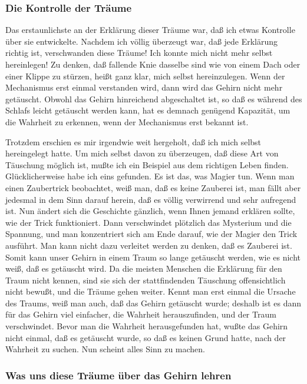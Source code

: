 \subsubsection{Die Kontrolle der Träume}
\label{c3_5f}

Das erstaunlichste an der Erklärung dieser Träume war, daß ich etwas Kontrolle über sie entwickelte.
Nachdem ich völlig überzeugt war, daß jede Erklärung richtig ist, verschwanden diese Träume!
Ich konnte mich nicht mehr selbst hereinlegen!
Zu denken, daß fallende Knie dasselbe sind wie von einem Dach oder einer Klippe zu stürzen, heißt ganz klar, mich selbst hereinzulegen.
Wenn der Mechanismus erst einmal verstanden wird, dann wird das Gehirn nicht mehr getäuscht.
Obwohl das Gehirn hinreichend abgeschaltet ist, so daß es während des Schlafs leicht getäuscht werden kann, hat es demnach genügend Kapazität, um die Wahrheit zu erkennen, wenn der Mechanismus erst bekannt ist.

Trotzdem erschien es mir irgendwie weit hergeholt, daß ich mich selbst hereingelegt hatte.
Um mich selbst davon zu überzeugen, daß diese Art von Täuschung möglich ist, mußte ich ein Beispiel aus dem richtigen Leben finden.
Glücklicherweise habe ich eins gefunden.
Es ist das, was Magier tun.
Wenn man einen Zaubertrick beobachtet, weiß man, daß es keine Zauberei ist, man fällt aber jedesmal in dem Sinn darauf herein, daß es völlig verwirrend und sehr aufregend ist.
Nun ändert sich die Geschichte gänzlich, wenn Ihnen jemand erklären sollte, wie der Trick funktioniert.
Dann verschwindet plötzlich das Mysterium und die Spannung, und man konzentriert sich am Ende darauf, wie der Magier den Trick ausführt.
Man kann nicht dazu verleitet werden zu denken, daß es Zauberei ist.
Somit kann unser Gehirn in einem Traum so lange getäuscht werden, wie es nicht weiß, daß es getäuscht wird.
Da die meisten Menschen die Erklärung für den Traum nicht kennen, sind sie sich der stattfindenden Täuschung offensichtlich nicht bewußt, und die Träume gehen weiter.
Kennt man erst einmal die Ursache des Traums, weiß man auch, daß das Gehirn getäuscht wurde; deshalb ist es dann für das Gehirn viel einfacher, die Wahrheit herauszufinden, und der Traum verschwindet.
Bevor man die Wahrheit herausgefunden hat, wußte das Gehirn nicht einmal, daß es getäuscht wurde, so daß es keinen Grund hatte, nach der Wahrheit zu suchen.
Nun scheint alles Sinn zu machen.


\subsubsection{Was uns diese Träume über das Gehirn lehren}
\label{c3_5g}


